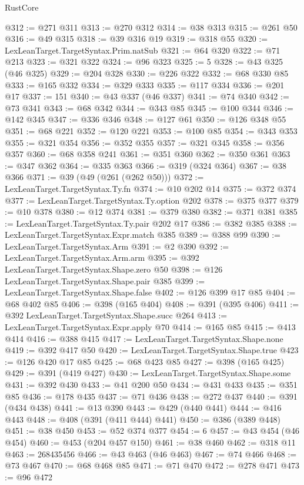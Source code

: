 \begin{lexlean}{RustCore}
\begin{coremodule}
@312 := @271 @311
@313 := @270 @312
@314 := @38 @313
@315 := @261 @50
@316 := @49 @315
@318 := @39 @316 @19
@319 := @318 @55
@320 := LexLeanTarget.TargetSyntax.Prim.natSub
@321 := @64 @320
@322 := @71 @213
@323 := @321 @322
@324 := @96 @323
@325 := 5
@328 := @43 @325 (@46 @325)
@329 := @204 @328
@330 := @226 @322
@332 := @68 @330 @85
@333 := @165 @332
@334 := @329 @333
@335 := @117 @334
@336 := @201 @17
@337 := 151
@340 := @43 @337 (@46 @337)
@341 := @74 @340
@342 := @73 @341
@343 := @68 @342
@344 := @343 @85
@345 := @100 @344
@346 := @142 @345
@347 := @336 @346
@348 := @127 @61
@350 := @126 @348 @55
@351 := @68 @221
@352 := @120 @221
@353 := @100 @85
@354 := @343 @353
@355 := @321 @354
@356 := @352 @355
@357 := @321 @345
@358 := @356 @357
@360 := @68 @358 @241
@361 := @351 @360
@362 := @350 @361
@363 := @347 @362
@364 := @335 @363
@366 := @319 (@324 @364)
@367 := @38 @366
@371 := @39 (@49 (@261 (@262 @50)))
@372 := LexLeanTarget.TargetSyntax.Ty.fn
@374 := @10 @202 @14
@375 := @372 @374
@377 := LexLeanTarget.TargetSyntax.Ty.option @202
@378 := @375 @377
@379 := @10 @378
@380 := @12 @374
@381 := @379 @380
@382 := @371 @381
@385 := LexLeanTarget.TargetSyntax.Ty.pair @202 @17
@386 := @382 @385
@388 := LexLeanTarget.TargetSyntax.Expr.match @385
@389 := @388 @99
@390 := LexLeanTarget.TargetSyntax.Arm
@391 := @2 @390
@392 := LexLeanTarget.TargetSyntax.Arm.arm
@395 := @392 LexLeanTarget.TargetSyntax.Shape.zero @50
@398 := @126 LexLeanTarget.TargetSyntax.Shape.pair @385
@399 := LexLeanTarget.TargetSyntax.Shape.false
@402 := @126 @399 @17 @85
@404 := @68 @402 @85
@406 := @398 (@165 @404)
@408 := @391 (@395 @406)
@411 := @392 LexLeanTarget.TargetSyntax.Shape.succ @264
@413 := LexLeanTarget.TargetSyntax.Expr.apply @70
@414 := @165 @85
@415 := @413 @414
@416 := @388 @415
@417 := LexLeanTarget.TargetSyntax.Shape.none
@419 := @392 @417 @50
@420 := LexLeanTarget.TargetSyntax.Shape.true
@423 := @126 @420 @17 @85
@425 := @68 @423 @85
@427 := @398 (@165 @425)
@429 := @391 (@419 @427)
@430 := LexLeanTarget.TargetSyntax.Shape.some
@431 := @392 @430
@433 := @41 @200 @50
@434 := @431 @433
@435 := @351 @85
@436 := @178 @435
@437 := @71 @436
@438 := @272 @437
@440 := @391 (@434 @438)
@441 := @13 @390
@443 := @429 (@440 @441)
@444 := @416 @443
@448 := @408 (@391 (@411 @444) @441)
@450 := @386 (@389 @448)
@451 := @38 @450
@453 := @52 @374 @377
@454 := 6
@457 := @43 @454 (@46 @454)
@460 := @453 (@204 @457 @150)
@461 := @38 @460
@462 := @318 @11
@463 := 268435456
@466 := @43 @463 (@46 @463)
@467 := @74 @466
@468 := @73 @467
@470 := @68 @468 @85
@471 := @71 @470
@472 := @278 @471
@473 := @96 @472

\end{coremodule}
\end{lexlean}
